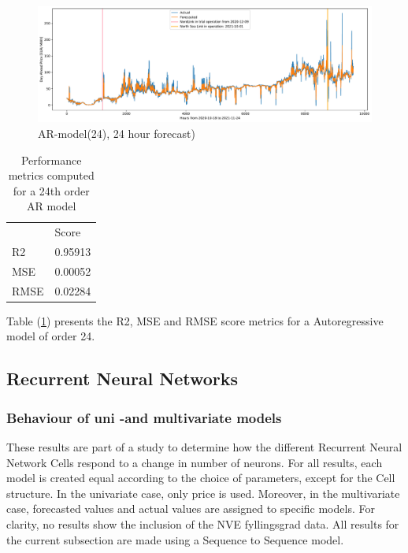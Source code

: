 \documentclass
[twocolumn,
secnumarabic,
nobibnotes,
aps,
prl,
reprint,
groupedaddress,
amsmath,
amssymb,
]{revtex4-2}
\begin{document}
\begin{figure}
  \includegraphics[width= 2.1\columnwidth]{figures/AR(24)_daily predictions.pdf} 
  \caption{\label{fig:AR(24)_daily predictions} AR-model(24), 24 hour forecast)}
\end{figure}

\begin{table}[]
  \caption{\label{tab_ar} Performance metrics computed for a 24th order AR model}
  \begin{tabular}{l|l|}
       & Score   \\
  R2   & 0.95913 \\
  MSE  & 0.00052 \\
  RMSE & 0.02284
  \end{tabular}
\end{table}

Table (\ref{tab_ar}) presents the R2, MSE and RMSE score metrics for a Autoregressive model of order 24. 

\subsection{Recurrent Neural Networks}

\subsubsection{Behaviour of uni -and multivariate models}
These results are part of a study to determine how the different Recurrent Neural Network Cells respond to a change in number of neurons. For all results, each model is created equal according to the choice of parameters, except for the Cell structure. In the univariate case, only price is used. Moreover, in the multivariate case, forecasted values and actual values are assigned to specific models. For clarity, no results show the inclusion of the NVE fyllingsgrad data. All results for the current subsection are made using a Sequence to Sequence model.
\end{document}
